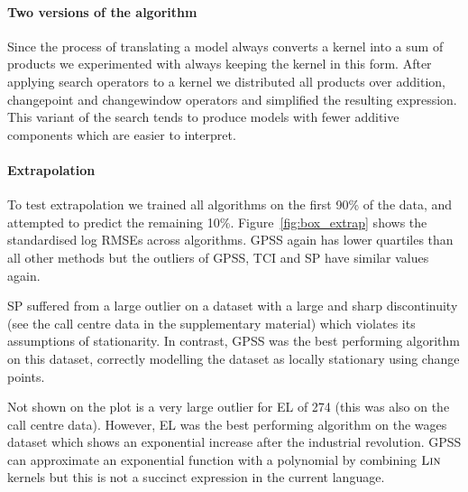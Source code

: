 \documentclass{article}
\def\eg{e.g.\ }
\begin{document}
\paragraph{Two versions of the algorithm}


Since the process of translating a model always converts a kernel into a sum of products we experimented with always keeping the kernel in this form.
After applying search operators to a kernel we distributed all products over addition, changepoint and changewindow operators and simplified the resulting expression.%
This variant of the search tends to produce models with fewer additive components which are easier to interpret.



\paragraph{Extrapolation}

To test extrapolation we trained all algorithms on the first 90\% of the data, and attempted to predict the remaining 10\%.
Figure~\ref{fig:box_extrap} shows the standardised log RMSEs across algorithms.
GPSS again has lower quartiles than all other methods but the outliers of GPSS, TCI and SP have similar values again.



SP suffered from a large outlier on a dataset with a large and sharp discontinuity (see the call centre data in the supplementary material) which violates its assumptions of stationarity.
In contrast, GPSS was the best performing algorithm on this dataset, correctly modelling the dataset as locally stationary using change points.

Not shown on the plot is a very large outlier for EL of 274 (this was also on the call centre data).
However, EL was the best performing algorithm on the wages dataset which shows an exponential increase after the industrial revolution.
GPSS can approximate an exponential function with a polynomial by combining ${\textsc{Lin}}$ kernels but this is not a succinct expression in the current language.
\end{document}
